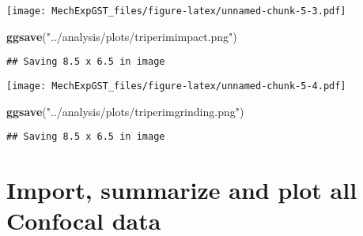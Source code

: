 \documentclass[
]{article}
\newenvironment{Shaded}{\begin{snugshade}}{\end{snugshade}}
\newcommand{\DataTypeTok}[1]{\textcolor[rgb]{0.13,0.29,0.53}{#1}}
\newcommand{\KeywordTok}[1]{\textcolor[rgb]{0.13,0.29,0.53}{\textbf{#1}}}
\newcommand{\NormalTok}[1]{#1}
\newcommand{\OperatorTok}[1]{\textcolor[rgb]{0.81,0.36,0.00}{\textbf{#1}}}
\newcommand{\StringTok}[1]{\textcolor[rgb]{0.31,0.60,0.02}{#1}}
\begin{document}
\texttt{[image: MechExpGST\_files/figure-latex/unnamed-chunk-5-3.pdf]}

\begin{Shaded}
\begin{Highlighting}[]
\KeywordTok{ggsave}\NormalTok{(}\StringTok{"../analysis/plots/triperimimpact.png"}\NormalTok{)}
\end{Highlighting}
\end{Shaded}

\begin{verbatim}
## Saving 8.5 x 6.5 in image
\end{verbatim}

\begin{Shaded}
\end{Shaded}

\texttt{[image: MechExpGST\_files/figure-latex/unnamed-chunk-5-4.pdf]}

\begin{Shaded}
\begin{Highlighting}[]
\KeywordTok{ggsave}\NormalTok{(}\StringTok{"../analysis/plots/triperimgrinding.png"}\NormalTok{)}
\end{Highlighting}
\end{Shaded}

\begin{verbatim}
## Saving 8.5 x 6.5 in image
\end{verbatim}

\hypertarget{import-summarize-and-plot-all-confocal-data}{%
\section{Import, summarize and plot all Confocal
data}\label{import-summarize-and-plot-all-confocal-data}}
\end{document}
